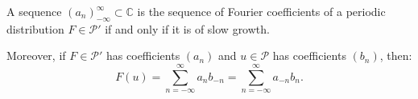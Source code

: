 A sequence $(a_n)_{-\infty}^{\infty} \subset \mathbb{C}$ is the sequence of Fourier coefficients of a periodic distribution $F \in \mathcal{P}'$ if and only if it is of slow growth.

Moreover, if $F \in \mathcal{P}'$ has coefficients $(a_n)$ and $u \in \mathcal{P}$ has coefficients $(b_n)$, then:
\[
F(u) = \sum_{n=-\infty}^{\infty} a_n b_{-n} = \sum_{n=-\infty}^{\infty} a_{-n} b_n.
\]
